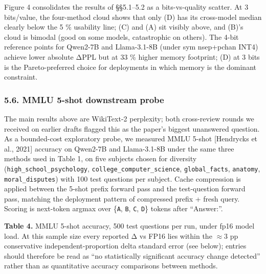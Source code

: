 Figure 4 consolidates the results of §§5.1--5.2 as a bits-vs-quality
scatter. At 3 bits/value, the four-method cloud shows that only (D) has
its cross-model median clearly below the 5 \% usability line; (C) and
(A) sit visibly above, and (B)'s cloud is bimodal (good on some models,
catastrophic on others). The 4-bit reference points for Qwen2-7B and
Llama-3.1-8B (under sym nsep+pchan INT4) achieve lower absolute ΔPPL but
at 33 \% higher memory footprint; (D) at 3 bits is the Pareto-preferred
choice for deployments in which memory is the dominant constraint.

\subsubsection{5.6. MMLU 5-shot downstream
probe}\label{mmlu-5-shot-downstream-probe}

The main results above are WikiText-2 perplexity; both cross-review
rounds we received on earlier drafts flagged this as the paper's biggest
unanswered question. As a bounded-cost exploratory probe, we measured
MMLU 5-shot {[}Hendrycks et al., 2021{]} accuracy on Qwen2-7B and
Llama-3.1-8B under the same three methods used in Table 1, on five
subjects chosen for diversity (\texttt{high\_school\_psychology},
\texttt{college\_computer\_science}, \texttt{global\_facts},
\texttt{anatomy}, \texttt{moral\_disputes}) with 100 test questions per
subject. Cache compression is applied between the 5-shot prefix forward
pass and the test-question forward pass, matching the deployment pattern
of compressed prefix + fresh query. Scoring is next-token argmax over
\{\texttt{A}, \texttt{B}, \texttt{C}, \texttt{D}\} tokens after
``Answer:''.

\textbf{Table 4.} MMLU 5-shot accuracy, 500 test questions per run,
under fp16 model load. At this sample size every reported Δ vs FP16 lies
within the \(\approx 3\) pp conservative independent-proportion delta
standard error (see below); entries should therefore be read as ``no
statistically significant accuracy change detected'' rather than as
quantitative accuracy comparisons between methods.

